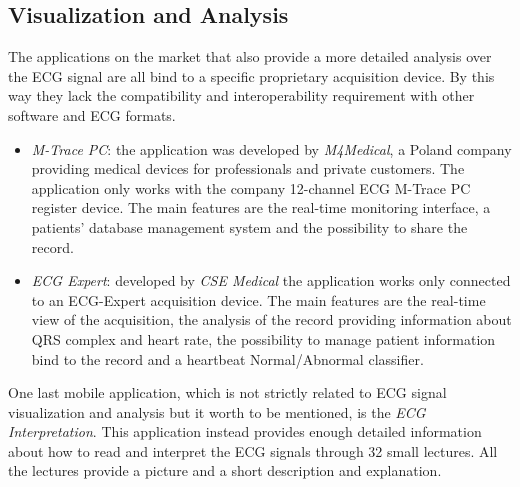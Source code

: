 \subsection{Visualization and Analysis}
The applications on the market that also provide a more detailed analysis over the ECG signal are all bind to a specific proprietary acquisition device. By this way they lack the compatibility and interoperability requirement with other software and ECG formats.
\begin{itemize}
	\item \textit{M-Trace PC}: the application was developed by \textit{M4Medical}, a Poland company providing medical devices for professionals and private customers. The application only works with the company 12-channel ECG M-Trace PC register device. The main features are the real-time monitoring interface, a patients’ database management system and the possibility to share the record.
	\item \textit{ECG Expert}: developed by \textit{CSE Medical} the application works only connected to an ECG-Expert acquisition device. The main features are the real-time view of the acquisition, the analysis of the record providing information about QRS complex and heart rate, the possibility to manage patient information bind to the record and a heartbeat Normal/Abnormal classifier.
\end{itemize}
One last mobile application, which is not strictly related to ECG signal visualization and analysis but it worth to be mentioned, is the \textit{ECG Interpretation}. This application instead provides  enough detailed information about how to read and interpret the ECG signals through 32 small lectures. All the lectures provide a picture and a short description and explanation.